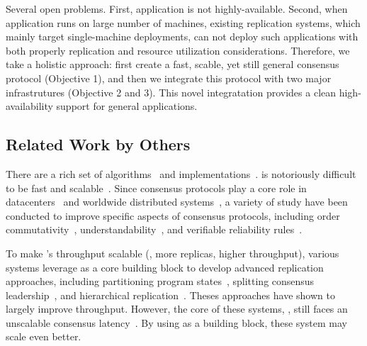 Several open problems. First, application is not highly-available. Second, when 
application runs on large number of machines, existing replication systems, 
which mainly target single-machine deployments, can not deploy such 
applications with both properly replication and resource utilization 
considerations. Therefore, we take a holistic approach: first create a fast, 
scable, yet still general consensus protocol (Objective 1), and then we 
integrate this protocol with two major infrastrutures (Objective 2 and 3). This 
novel integratation provides a clean high-availability support for general  
applications.

\vspace{-.15in}\subsection{Related Work by Others} 
 \label{sec:others-work}\vspace{-.075in} 
There are a rich set of
\paxos algorithms~\cite{paxos:practical,paxos,paxos:simple,paxos:complex,
epaxos:sosp13} and 
implementations~\cite{paxos:live,paxos:practical,chubby:osdi,crane:sosp15}. 
\paxos is notoriously difficult to be fast and 
scalable~\cite{ellis:thesis,manos:hotdep10,scatter:sosp11}. Since consensus 
protocols play a core role in datacenters~\cite{matei:hotcloud11, mesos:nsdi11, 
datacenter:os} and worldwide 
distributed systems~\cite{spanner:osdi12,mencius:osdi08}, a variety of study 
have been conducted to improve specific aspects of consensus protocols, 
including order commutativity~\cite{epaxos:sosp13}, 
understandability~\cite{raft:usenix14,paxos}, and verifiable reliability 
rules~\cite{modist:nsdi09,demeter:sosp11}.

To make \paxos's throughput scalable (\ie, more replicas, higher throughput), 
various systems leverage \paxos as a core building block to develop advanced 
replication approaches, including partitioning program 
states~\cite{scatter:sosp11,ssmr:dsn14}, splitting consensus 
leadership~\cite{mencius:osdi08,spaxos:srds12}, and hierarchical 
replication~\cite{manos:hotdep10,scatter:sosp11}. Theses approaches have shown 
to largely improve throughput. However, the core of these systems, 
\paxos, still faces an unscalable consensus 
latency~\cite{ellis:thesis,scatter:sosp11,manos:hotdep10}. By using \xxx as a 
building block, these system may scale even better.


